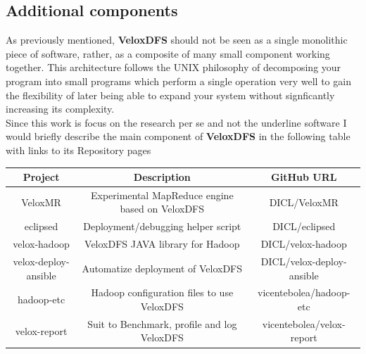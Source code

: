 \subsection{Additional components}

As previously mentioned, \textbf{VeloxDFS} should not be seen as a single
monolithic piece of software, rather, as a composite of many small component
working together. This architecture follows the UNIX philosophy of decomposing
your program into small programs which perform a single operation very well to
gain the flexibility of later being able to expand your system without
signficantly increasing its complexity. \\ 

Since this work is focus on the research per se and not the underline software
I would briefly describe the main component of \textbf{VeloxDFS} in the
following table with links to its Repository pages 

\begin{table}
\footnotesize{}
\centering
\begin{tabular}{ |c|c|c| } 
 \hline
Project                               & Description                  & GitHub URL  \\
 \hline
VeloxMR           &  Experimental MapReduce engine based on VeloxDFS & DICL/VeloxMR \\
 \hline
eclipsed          & Deployment/debugging helper script & DICL/eclipsed \\
 \hline
velox-hadoop      & VeloxDFS JAVA library for Hadoop                 & DICL/velox-hadoop \\
 \hline
velox-deploy-ansible & Automatize deployment of VeloxDFS & DICL/velox-deploy-ansible \\
 \hline
hadoop-etc        & Hadoop configuration files to use VeloxDFS       & vicentebolea/hadoop-etc \\
 \hline
velox-report      & Suit to Benchmark, profile and log VeloxDFS & vicentebolea/velox-report \\
 \hline
\end{tabular}
\label{tab:ecosystem}
\end{table}
